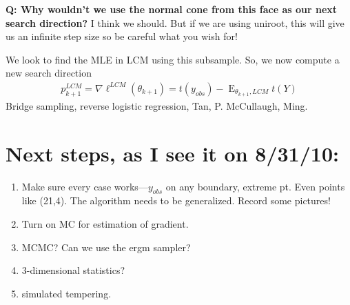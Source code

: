 \documentclass{amsbook}
\DeclareMathOperator{\E}{E}
\theoremstyle{definition}
\theoremstyle{remark}
\begin{document}
\textbf{Q: Why wouldn't we use the normal cone from this face as our next search direction?}
I think we should.  But if we are using uniroot, this will give us an infinite step size so be careful what you wish for!

We look to find the MLE in LCM using this subsample.  So, we now compute a new search direction
\begin{align*}
	p_{k+1}^{LCM} = \nabla \ell^{LCM}(\theta_{k+1}) = t(y_{obs}) - \E_{\theta_{k+1}, LCM}t(Y)
\end{align*}
Bridge sampling, reverse logistic regression, Tan, P. McCullaugh, Ming.


\section{Next steps, as I see it on 8/31/10:}
\begin{enumerate}
\item Make sure every case works---$y_{obs}$ on any boundary, extreme pt.  Even points like (21,4).  The algorithm needs to be generalized.  Record some pictures!
\item Turn on MC for estimation of gradient.  
\item MCMC?  Can we use the ergm sampler?
\item 3-dimensional statistics?
\item simulated tempering.
\end{enumerate}



\end{document}
